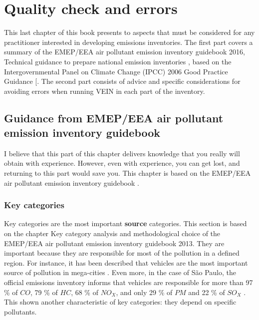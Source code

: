 \documentclass[12pt,graybox,envcountchap,sectrefs]{krantz}
\theoremstyle{definition}
\theoremstyle{definition}
\theoremstyle{definition}
\theoremstyle{remark}
\begin{document}
\chapter{Quality check and errors}\label{check}

This last chapter of this book presents to aspects that must be
considered for any practitioner interested in developing emissions
inventories. The first part covers a summary of the EMEP/EEA air
pollutant emission inventory guidebook 2016, Technical guidance to
prepare national emission inventories \citep{guia}, based on the
Intergovernmental Panel on Climate Change (IPCC) 2006 Good Practice
Guidance {[}\citet{change20062006}. The second part consists of advice
and specific considerations for avoiding errors when running VEIN in
each part of the inventory.

\section{Guidance from EMEP/EEA air pollutant emission inventory
guidebook}\label{guidance-from-emepeea-air-pollutant-emission-inventory-guidebook}

I believe that this part of this chapter delivers knowledge that you
really will obtain with experience. However, even with experience, you
can get lost, and returning to this part would save you. This chapter is
based on the EMEP/EEA air pollutant emission inventory guidebook
\citep{guia}.

\subsection{Key categories}\label{key-categories}

Key categories are the most important \textbf{source} categories. This
section is based on the chapter Key category analysis and methodological
choice \citep{guiak} of the EMEP/EEA air pollutant emission inventory
guidebook 2013. They are important because they are responsible for most
of the pollution in a defined region. For instance, it has been
described that vehicles are the most important source of pollution in
mega-cities \citep{molina2004megacities}. Even more, in the case of São
Paulo, the official emissions inventory informs that vehicles are
responsible for more than 97 \% of \(CO\), 79 \% of \(HC\), 68 \% of
\(NO_X\), and only 29 \% of \(PM\) and 22 \% of \(SO_X\)
\citep{CETESB2015}. This shown another characteristic of key categories:
they depend on specific pollutants.
\end{document}
